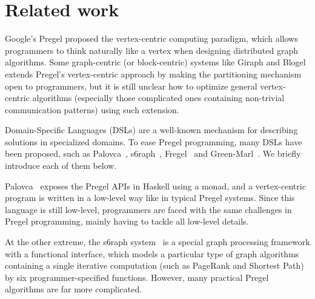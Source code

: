 \documentclass{sokendai_thesis} %
\newcommand{\plus}{\raisebox{.25ex}{\scalebox{.8}{+}}}
\begin{document}
\section{Related work}

Google's Pregel \cite{pregel} proposed the vertex-centric computing paradigm, which allows programmers to think naturally like a vertex when designing distributed graph algorithms.
Some graph-centric (or block-centric) systems like Giraph\plus\cite{thinkgraph} and Blogel~\cite{yan2014blogel} extends Pregel's vertex-centric approach by making the partitioning mechanism open to programmers, but it is still unclear how to optimize general vertex-centric algorithms (especially those complicated ones containing non-trivial communication patterns) using such extension.

Domain-Specific Languages (DSLs) are a well-known mechanism for describing solutions in specialized domains.
To ease Pregel programming, many DSLs have been proposed, such as Palovca~\cite{palovca}, s6raph~\cite{s6raph}, Fregel~\cite{fregel} and Green-Marl~\cite{green14}.
We briefly introduce each of them below.

Palovca~\cite{palovca} exposes the Pregel APIs in Haskell using a monad, and a vertex-centric program is written in a low-level way like in typical Pregel systems.
Since this language is still low-level, programmers are faced with the same challenges in Pregel programming, mainly having to tackle all low-level details.

At the other extreme, the s6raph system~\cite{s6raph} is a special graph processing framework with a functional interface, which models a particular type of graph algorithms containing a single iterative computation (such as PageRank and Shortest Path) by six programmer-specified functions.
However, many practical Pregel algorithms are far more complicated.
\end{document}

